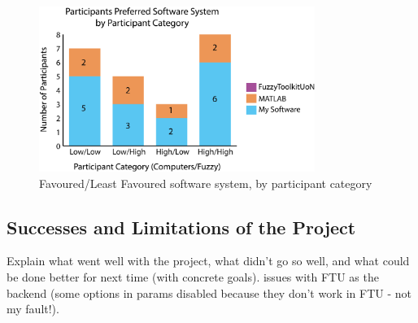 {{			\begin{figure}[ht!]
			\begin{center}
			\includegraphics[width=0.8\textwidth]{images/graphsSmall.png}
			\end{center}
			\vspace{-5mm}
			\caption{Favoured/Least Favoured software system, by participant category}
			\label{fig:mostleast}
			\vspace{-2mm}
			\end{figure}
			}
		}		


\subsection{Successes and Limitations of the Project}
{\color{red} 
Explain what went well with the project, what didn't go so well, and what could be done better for next time (with concrete goals).
issues with FTU as the backend (some options in params disabled because they don't work in FTU - not my fault!).

}